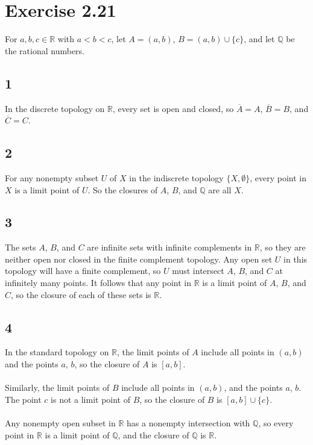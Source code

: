 \documentclass{article}
\begin{document}
\newpage 

\section*{Exercise 2.21}
For $a, b, c \in \mathbb{R}$ with $a < b < c$, let $A = (a, b)$, $B = (a, b) \cup \{c\}$, 
and let $\mathbb{Q}$ be the rational numbers.

\subsection*{1}
In the discrete topology on $\mathbb{R}$, every set is open and closed, so 
$\overline{A} = A$, $\overline{B} = B$, and $\overline{C} = C$.

\subsection*{2}
For any nonempty subset $U$ of $X$ in the indiscrete topology $\{X, \emptyset \}$, 
every point in $X$ is a limit point of $U$.  So the closures of $A$, $B$, and $\mathbb{Q}$ 
are all $X$.

\subsection*{3} 
The sets $A$, $B$, and $C$ are infinite sets with infinite complements in $\mathbb{R}$, 
so they are neither open nor closed in the finite complement topology.  
Any open set $U$ in this topology will have a finite complement, so $U$ must 
intersect $A$, $B$, and $C$ at infinitely many points.  It follows that 
any point in $\mathbb{R}$ is a limit point of $A$, $B$, and $C$, so the closure 
of each of these sets is $\mathbb{R}$. 

\subsection*{4}
In the standard topology on $\mathbb{R}$, the limit points of $A$ include all points in $(a, b)$ 
and the points $a$, $b$, so the closure of $A$ is $[a, b]$.\\ 
\\ 
Similarly, the limit points of $B$ include all points in $(a, b)$, and the points $a$, $b$.  
The point $c$ is not a limit point of $B$, so the closure of $B$ is $[a, b] \cup \{c\}$.\\ 
\\ 
Any nonempty open subset in $\mathbb{R}$ has a nonempty intersection with $\mathbb{Q}$, 
so every point in $\mathbb{R}$ is a limit point of $\mathbb{Q}$, and the closure of $\mathbb{Q}$ 
is $\mathbb{R}$.
\end{document}

